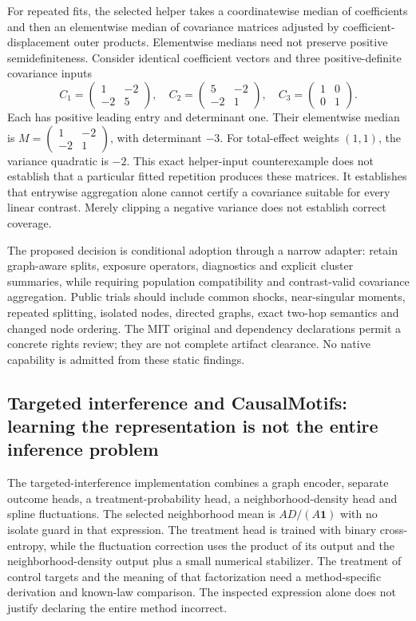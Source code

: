For repeated fits, the selected helper takes a coordinatewise median of coefficients and then an elementwise median of covariance matrices adjusted by coefficient-displacement outer products. Elementwise medians need not preserve positive semidefiniteness. Consider identical coefficient vectors and three positive-definite covariance inputs
\[
 C_1=\begin{pmatrix}1&-2\\-2&5\end{pmatrix},\quad
 C_2=\begin{pmatrix}5&-2\\-2&1\end{pmatrix},\quad
 C_3=\begin{pmatrix}1&0\\0&1\end{pmatrix}.
\]
Each has positive leading entry and determinant one. Their elementwise median is $M=\left(\begin{smallmatrix}1&-2\\-2&1\end{smallmatrix}\right)$, with determinant $-3$. For total-effect weights $(1,1)$, the variance quadratic is $-2$. This exact helper-input counterexample does not establish that a particular fitted repetition produces these matrices. It establishes that entrywise aggregation alone cannot certify a covariance suitable for every linear contrast. Merely clipping a negative variance does not establish correct coverage.\citep{exec25_pnet_choice}

The proposed decision is conditional adoption through a narrow adapter: retain graph-aware splits, exposure operators, diagnostics and explicit cluster summaries, while requiring population compatibility and contrast-valid covariance aggregation. Public trials should include common shocks, near-singular moments, repeated splitting, isolated nodes, directed graphs, exact two-hop semantics and changed node ordering. The MIT original and dependency declarations permit a concrete rights review; they are not complete artifact clearance. No native capability is admitted from these static findings.\citep{exec25_pnet_dml,exec25_pnet_choice}

\subsection{Targeted interference and CausalMotifs: learning the representation is not the entire inference problem}

The targeted-interference implementation combines a graph encoder, separate outcome heads, a treatment-probability head, a neighborhood-density head and spline fluctuations. The selected neighborhood mean is $AD/(A\mathbf1)$ with no isolate guard in that expression. The treatment head is trained with binary cross-entropy, while the fluctuation correction uses the product of its output and the neighborhood-density output plus a small numerical stabilizer. The treatment of control targets and the meaning of that factorization need a method-specific derivation and known-law comparison. The inspected expression alone does not justify declaring the entire method incorrect.\citep{exec25_pnet_targeted}

